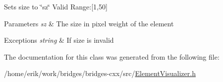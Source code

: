 Sets size to \char`\"{}sz\char`\"{} Valid Range\+:\mbox{[}1,50\mbox{]}


\begin{DoxyParams}{Parameters}
{\em sz} & The size in pixel weight of the element \\
\hline
\end{DoxyParams}

\begin{DoxyExceptions}{Exceptions}
{\em string} & If size is invalid \\
\hline
\end{DoxyExceptions}


The documentation for this class was generated from the following file\+:\begin{DoxyCompactItemize}
\item 
/home/erik/work/bridges/bridges-\/cxx/src/\hyperlink{_element_visualizer_8h}{Element\+Visualizer.\+h}\end{DoxyCompactItemize}
